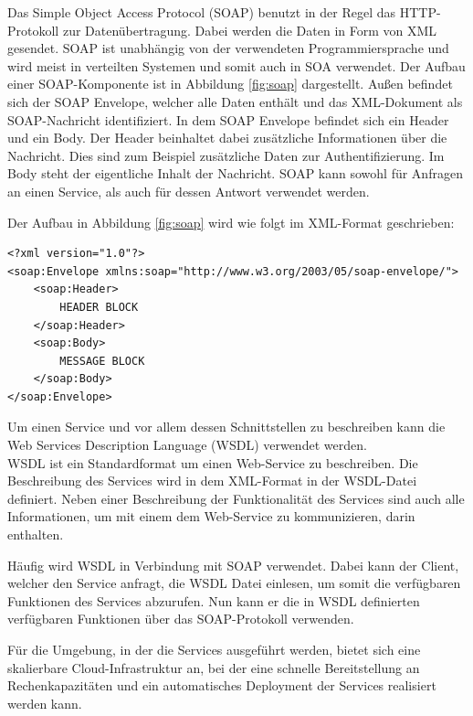 Das Simple Object Access Protocol (SOAP) benutzt in der Regel das HTTP-Protokoll zur Datenübertragung. Dabei werden die Daten in Form von XML gesendet. SOAP ist unabhängig von der verwendeten Programmiersprache und wird meist in verteilten Systemen und somit auch in SOA verwendet. Der Aufbau einer SOAP-Komponente ist in Abbildung \ref{fig:soap} dargestellt. Außen befindet sich der SOAP Envelope, welcher alle Daten enthält und das XML-Dokument als SOAP-Nachricht identifiziert. In dem SOAP Envelope befindet sich ein Header und ein Body. Der Header beinhaltet dabei zusätzliche Informationen über die Nachricht. Dies sind zum Beispiel zusätzliche Daten zur Authentifizierung. Im Body steht der eigentliche Inhalt der Nachricht. SOAP kann sowohl für Anfragen an einen Service, als auch für dessen Antwort verwendet werden. \cite{AlexanderS.Gillis.02.12.2022}

Der Aufbau in Abbildung \ref{fig:soap} wird wie folgt im XML-Format geschrieben: 

\begin{lstlisting}
<?xml version="1.0"?>
<soap:Envelope xmlns:soap="http://www.w3.org/2003/05/soap-envelope/">
    <soap:Header>
        HEADER BLOCK
    </soap:Header>
    <soap:Body>
        MESSAGE BLOCK
    </soap:Body>
</soap:Envelope>
\end{lstlisting}

Um einen Service und vor allem dessen Schnittstellen zu beschreiben kann die Web Services Description Language (WSDL) verwendet werden.\\
WSDL ist ein Standardformat um einen Web-Service zu beschreiben. Die Beschreibung des Services wird in dem XML-Format in der WSDL-Datei definiert. Neben einer Beschreibung der Funktionalität des Services sind auch alle Informationen, um mit einem dem Web-Service zu kommunizieren, darin enthalten. \cite{Heutschi.2007}

Häufig wird WSDL in Verbindung mit SOAP verwendet. Dabei kann der Client, welcher den Service anfragt, die WSDL Datei einlesen, um somit die verfügbaren Funktionen des Services abzurufen. Nun kann er die in WSDL definierten verfügbaren Funktionen über das SOAP-Protokoll verwenden. \cite{Heutschi.2007}

Für die Umgebung, in der die Services ausgeführt werden, bietet sich eine skalierbare Cloud-Infrastruktur an, bei der eine schnelle Bereitstellung an Rechenkapazitäten und ein automatisches Deployment der Services realisiert werden kann. 



